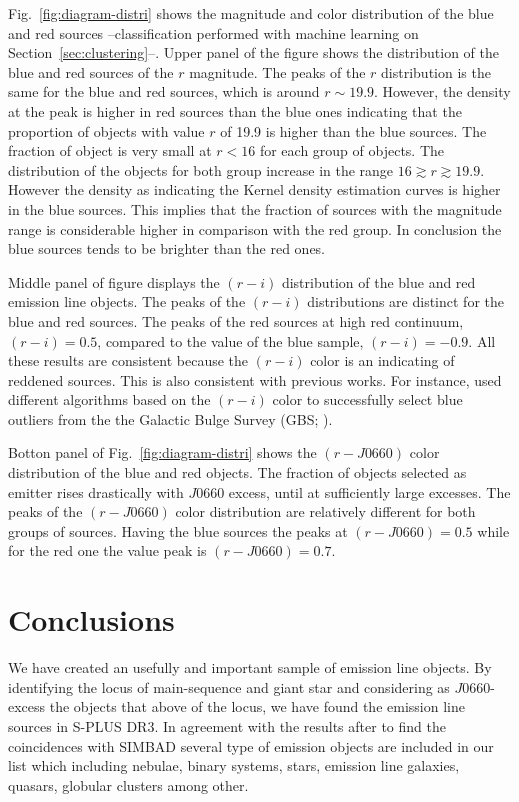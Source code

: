 \documentclass[fleqn,usenatbib]{mnras}
\begin{document}
Fig.~\ref{fig:diagram-distri} shows the magnitude and color distribution of the blue and red
sources --classification performed with machine learning on Section~\ref{sec:clustering}--.
Upper panel of the figure shows the distribution of the blue and red sources of the $r$ magnitude.
The peaks of the $r$ distribution is the same for the blue and red sources, which is around
$r \sim 19.9$. However, the density at the peak is higher in red sources than the blue ones
indicating that the proportion of objects with value $r$ of 19.9 is higher than the blue sources.
The fraction of object is very small at $r < 16$ for each group of objects.
The distribution of the objects for both group increase in the range $16 \gtrsim r \gtrsim 19.9$.
However the density as indicating the Kernel density estimation curves is higher in the
blue sources. This implies that the fraction of sources with the magnitude range is considerable higher in comparison with the red group. In conclusion the blue sources tends to be brighter than the red ones.

Middle panel of figure displays the $(r - i)$ distribution of the blue and red emission line
objects. The peaks of the $(r - i)$ distributions are distinct for the blue and red sources.
The peaks of the red sources at high red continuum,  $(r - i) = 0.5$, compared to the value
of the blue sample, $(r - i) = -0.9$. All these results are consistent because the $(r - i)$
color is an indicating of reddened sources. This is also consistent with previous works. 
For instance, \citet{Wevers:2017} used different algorithms based on the  $(r - i)$ color
to successfully select blue outliers from the the Galactic Bulge Survey (GBS; \citealp{Jonker:2011}).

Botton panel of Fig.~\ref{fig:diagram-distri} shows the
$(r - J0660)$ color distribution of the blue and red objects.  The fraction of objects selected
as emitter rises drastically with $J$0660 excess, until at sufficiently large excesses. The peaks of the $(r - J0660)$ color distribution are relatively different for both groups 
of sources. Having the blue sources the peaks at  $(r - J0660) = 0.5$ while for the red 
one the value peak is $(r - J0660)=0.7$.


\section{Conclusions}

We have created an usefully and important sample of emission line objects.
By identifying the locus of main-sequence and giant star and considering as
$J0660$-excess the objects that above of the locus, we have found
the emission line sources in S-PLUS DR3. In agreement with the results after
to find the coincidences with SIMBAD several type of emission objects are included
in our list which including nebulae, binary systems, stars, emission line galaxies,
quasars, globular clusters among other. \\
\end{document}
